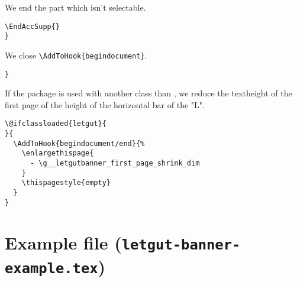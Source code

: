 \documentclass{letgut}
\begin{document}
We end the part which isn't selectable.
\begin{lstlisting}
\EndAccSupp{}
}
\end{lstlisting}

We close \lstinline+\AddToHook{begindocument}+.

\begin{lstlisting}
}
\end{lstlisting}

If the package is used with another class than , we reduce the
textheight of the first page of the height of the horizontal bar of the "L".

\begin{lstlisting}
\@ifclassloaded{letgut}{
}{
  \AddToHook{begindocument/end}{%
    \enlargethispage{
      - \g__letgutbanner_first_page_shrink_dim
    }
    \thispagestyle{empty}
  }
}
\end{lstlisting}

\section{Example file (\texttt{letgut-banner-example.tex})}
\label{Examplefileletgutbannerexampletex-heehxqt0fck0}
\end{document}
